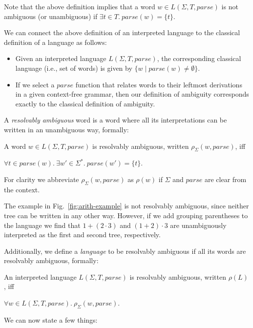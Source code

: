 \documentclass[acmsmall,review,anonymous]{acmart}\settopmatter{printfolios=true,printccs=false,printacmref=false}
\newcommand{\T}{\Sigma} %
\newcommand{\parse}{\mathit{parse}} %
\begin{document}
\noindent
Note that the above definition implies that a word $w \in L(\T, T,
\parse)$ is not ambiguous (or unambiguous) if $\exists t \in
T.\ \parse(w) = \{t\}$.

We can connect the above definition of an interpreted language to the
classical definition of a language as follows:

\begin{itemize}
\item Given an interpreted language $L(\T, T, \parse)$, the corresponding classical language (i.e., set of words) is given by $\{ w \mid \parse(w) \neq \emptyset \}$.
\item If we select a $\parse$ function that relates words to their leftmost derivations in a given context-free grammar, then our definition of ambiguity corresponds exactly to the classical definition of ambiguity.
\end{itemize}

\noindent A \emph{resolvably ambiguous} word is a word where all its interpretations can be written in an unambiguous way, formally:

\begin{definition}\label{def:resolvable-word}
  A word $w \in L(\T, T, \parse)$ is resolvably ambiguous, written $\rho_{\Sigma}(w, \parse)$, iff

  $\forall t \in \parse(w).\ \exists w' \in \T^{*}.\ \parse(w') = \{t\}$.
\end{definition}

For clarity we abbreviate $\rho_{\T}(w, \parse)$ as $\rho(w)$ if $\T$
and $\parse$ are clear from the context.

The example in Fig.~\ref{fig:arith-example} is not resolvably ambiguous, since neither tree can be written in any other way. However, if we add grouping parentheses to the language we find that $1 + (2 \cdot 3)$ and $(1 + 2) \cdot 3$ are unambiguously interpreted as the first and second tree, respectively.

Additionally, we define a \emph{language} to be resolvably ambiguous if all its words are resolvably ambiguous, formally:

\begin{definition}\label{def:resolvable-language}
  An interpreted language $L(\T, T, \parse)$ is resolvably ambiguous, written $\rho(L)$, iff

  $\forall w \in L(\T, T, \parse).\ \rho_{\T}(w, \parse)$.
\end{definition}

\noindent We can now state a few things:
\end{document}
